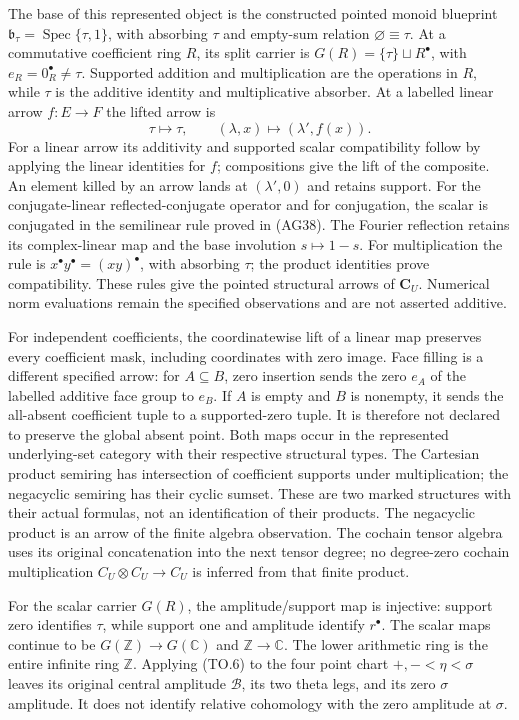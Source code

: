 The base of this represented object is the constructed pointed
monoid blueprint $\mathfrak b_\tau=\operatorname{Spec}\{\tau,1\}$,
with absorbing $\tau$ and empty-sum relation
$\varnothing\equiv\tau$.  At a commutative coefficient ring $R$,
its split carrier is $G(R)=\{\tau\}\sqcup R^\bullet$, with
$e_R=0_R^\bullet\ne\tau$.  Supported addition and multiplication
are the operations in $R$, while $\tau$ is the additive identity
and multiplicative absorber.  At a labelled linear arrow $f:E\to F$
the lifted arrow is
\[
 \tau\longmapsto\tau,\qquad
 (\lambda,x)\longmapsto(\lambda',f(x)).                      \tag{TO.6}
\]
For a linear arrow its additivity and supported scalar compatibility follow by
applying the linear identities for $f$; compositions give the
lift of the composite.  An element killed by an arrow lands at
$(\lambda',0)$ and retains support. For the conjugate-linear
reflected-conjugate operator and for conjugation, the scalar is
conjugated in the semilinear rule proved in (AG38). The Fourier
reflection retains its complex-linear map and the base involution
$s\mapsto1-s$.
For multiplication the rule is $x^\bullet y^\bullet=(xy)^\bullet$,
with absorbing $\tau$; the product identities prove compatibility.
These rules give the pointed structural arrows of $\mathbf C_U$.
Numerical norm evaluations remain the specified observations and
are not asserted additive.

For independent coefficients, the coordinatewise lift of a linear
map preserves every coefficient mask, including coordinates with
zero image. Face filling is a different specified arrow: for
$A\subseteq B$, zero insertion sends the zero $e_A$ of the
labelled additive face group to $e_B$. If $A$ is empty and $B$
is nonempty, it sends the all-absent coefficient tuple to a
supported-zero tuple. It is therefore not declared to preserve
the global absent point. Both maps occur in the represented
underlying-set category with their respective structural types.
The Cartesian product semiring has intersection of coefficient
supports under multiplication; the negacyclic semiring has their
cyclic sumset. These are two marked structures with their actual
formulas, not an identification of their products. The negacyclic
product is an arrow of the finite algebra observation. The
cochain tensor algebra uses its original concatenation into the
next tensor degree; no degree-zero cochain multiplication
$C_U\otimes C_U\to C_U$ is inferred from that finite product.

For the scalar carrier $G(R)$, the amplitude/support map is injective: support zero identifies
$\tau$, while support one and amplitude identify $r^\bullet$.
The scalar maps continue to be $G(\mathbb Z)\to G(\mathbb C)$
and $\mathbb Z\to\mathbb C$.  The lower arithmetic ring is the
entire infinite ring $\mathbb Z$.  Applying (TO.6) to the four
point chart $+,-<\eta<\sigma$ leaves its original central
amplitude $\mathscr B$, its two theta legs, and its zero
$\sigma$ amplitude.  It does not identify relative cohomology
with the zero amplitude at $\sigma$.

